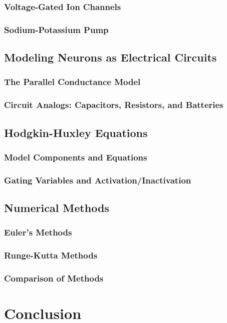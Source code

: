 \documentclass{article} %
\begin{document}
\begin{multicols}{2}
\subsubsection{Voltage-Gated Ion Channels}
\subsubsection{Sodium-Potassium Pump}

\subsection{Modeling Neurons as Electrical Circuits}
\subsubsection{The Parallel Conductance Model}
\subsubsection{Circuit Analogs: Capacitors, Resistors, and Batteries}

\subsection{Hodgkin-Huxley Equations}
\subsubsection{Model Components and Equations}
\subsubsection{Gating Variables and Activation/Inactivation}

\subsection{Numerical Methods}
\subsubsection{Euler's Methods}
\subsubsection{Runge-Kutta Methods}
\subsubsection{Comparison of Methods}


\section{Conclusion}

\label{last_page}

\newpage



\end{multicols}
\end{document}
